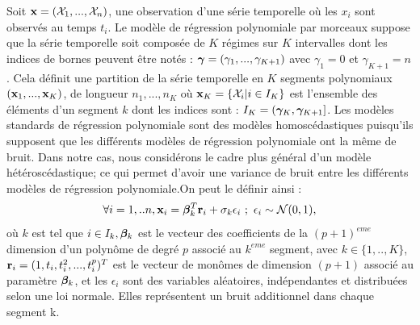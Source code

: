 \documentclass[12pt]{article}
\begin{document}
Soit ${\mathbf{x}}= ({\mathcal{X}}_{1},...,{\mathcal{X}}_{n})$, une observation d'une série temporelle où les $x_{i}$ sont observés au temps $t_{i}$. Le modèle de régression polynomiale par morceaux suppose que la série temporelle soit composée de $K$ régimes sur $K$ intervalles dont les indices de bornes peuvent être notés : $\boldsymbol{\gamma}=(\gamma_{1},...,\gamma_{K+1})$ avec $\gamma_{1}=0$ et $\gamma_{K+1}=n$. Cela définit une partition de la série temporelle en $K$ segments polynomiaux $({\mathbf{x}}_{1},...,{\mathbf{x}}_{K})$, de longueur $n_{1},...,n_{K}$ où ${\mathbf{x}}_{K}=\{{\mathcal{X}}_{i}| i\in I_{K}\}$ est l'ensemble des éléments d'un segment $k$ dont les indices sont : $I_{K}=(\boldsymbol{\gamma}_{K},\boldsymbol{\gamma}_{K+1}]$. Les modèles standards de régression polynomiale sont des modèles homoscédastiques puisqu'ils supposent que les différents modèles de régression polynomiale ont la même de bruit. Dans notre cas, nous considérons le cadre plus général d'un modèle hétéroscédastique; ce qui permet d'avoir une variance de bruit entre les différents modèles de régression polynomiale.On peut le définir ainsi : 
\begin{equation}
\forall{i}=1,..n, {\mathbf{x}}_{i}=\boldsymbol{\beta}^{T}_{k}\mathbf{r}_{i} + \sigma_{k}\epsilon_{i} \, \, ; \,\, \epsilon_{i}\sim \mathcal{N} (0,1),
\label{eq:Hyp1}
\end{equation}
où $k$ est tel que $i\in I_{k}, \boldsymbol{\beta}_{k}$ est le vecteur des coefficients de la $(p+1)^{eme}$ dimension d'un polynôme de degré $p$ associé au $k^{eme}$ segment, avec $k\in \{1,..,K\}$, 
$\mathbf{r}_{i}=(1,t_{i},t_{i}^{2},...,t_{i}^{p})^T$ est le vecteur de monômes de dimension $(p+1)$ associé au paramètre $\boldsymbol{\beta}_{k}$, et les $\epsilon_{i}$ sont des variables aléatoires, indépendantes et distribuées selon une loi normale. Elles représentent un bruit additionnel dans chaque segment k.  
\end{document}
